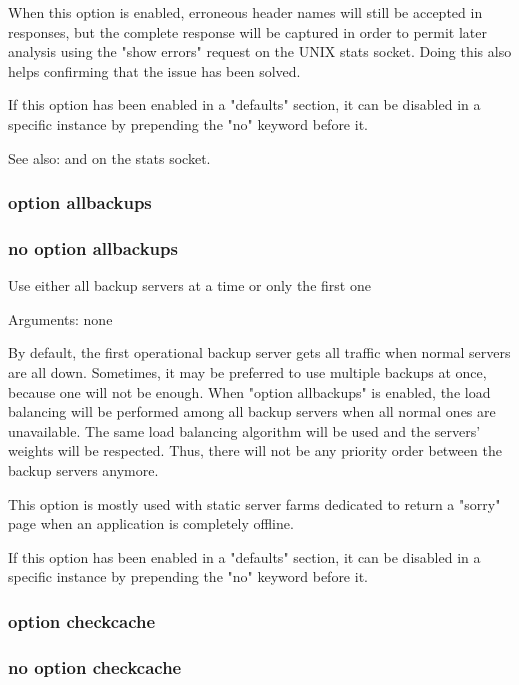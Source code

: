   When this option is enabled, erroneous header names will still be accepted in
  responses, but the complete response will be captured in order to permit
  later analysis using the "show errors" request on the UNIX stats socket.
  Doing this also helps confirming that the issue has been solved.

  If this option has been enabled in a "defaults" section, it can be disabled
  in a specific instance by prepending the "no" keyword before it.

  See also:  and  on the
             stats socket.

\subsubsection[option allbackups]{option allbackups}
\subsubsection[no option allbackups]{no option allbackups}


  Use either all backup servers at a time or only the first one


  Arguments: none

  By default, the first operational backup server gets all traffic when normal
  servers are all down. Sometimes, it may be preferred to use multiple backups
  at once, because one will not be enough. When "option allbackups" is enabled,
  the load balancing will be performed among all backup servers when all normal
  ones are unavailable. The same load balancing algorithm will be used and the
  servers' weights will be respected. Thus, there will not be any priority
  order between the backup servers anymore.

  This option is mostly used with static server farms dedicated to return a
  "sorry" page when an application is completely offline.

  If this option has been enabled in a "defaults" section, it can be disabled
  in a specific instance by prepending the "no" keyword before it.

\subsubsection[option checkcache]{option checkcache}
\subsubsection[no option checkcache]{no option checkcache}

